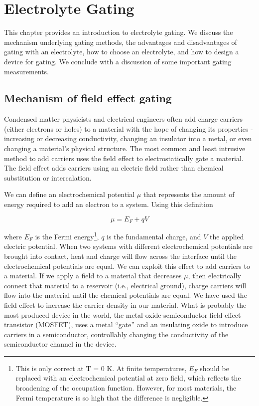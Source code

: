 \chapter{Electrolyte Gating}

This chapter provides an introduction to electrolyte gating. We discuss the mechanism underlying gating methods, the advantages and disadvantages of gating with an electrolyte, how to choose an electrolyte, and how to design a device for gating. We conclude with a discussion of some important gating measurements.

\section{Mechanism of field effect gating}

Condensed matter physicists and electrical engineers often add charge carriers (either electrons or holes) to a material with the hope of changing its properties - increasing or decreasing conductivity, changing an insulator into a metal, or even changing a material's physical structure. The most common and least intrusive method to add carriers uses the field effect to electrostatically gate a material. The field effect adds carriers using an electric field rather than chemical substitution or intercalation. 

We can define an electrochemical potential $\mu$ that represents the amount of energy required to add an electron to a system. Using this definition

\begin{equation}
\mu = E_{F} + qV
\end{equation}

where $E_{F}$ is the Fermi energy\footnote{This is only correct at T = 0 K. At finite temperatures, $E_{F}$ should be replaced with an electrochemical potential at zero field, which reflects the broadening of the occupation function. However, for most materials, the Fermi temperature is so high that the difference is negligible.}, $q$ is the fundamental charge, and $V$ the applied electric potential. When two systems with different electrochemical potentials are brought into contact, heat and charge will flow across the interface until the electrochemical potentials are equal. We can exploit this effect to add carriers to a material. If we apply a field to a material that decreases $\mu$, then electrically connect that material to a reservoir (i.e., electrical ground), charge carriers will flow into the material until the chemical potentials are equal. We have used the field effect to increase the carrier density in our material. What is probably the most produced device in the world, the metal-oxide-semiconductor field effect transistor (MOSFET), uses a metal ``gate'' and an insulating oxide to introduce carriers in a semiconductor, controllably changing the conductivity of the semiconductor channel in the device.

